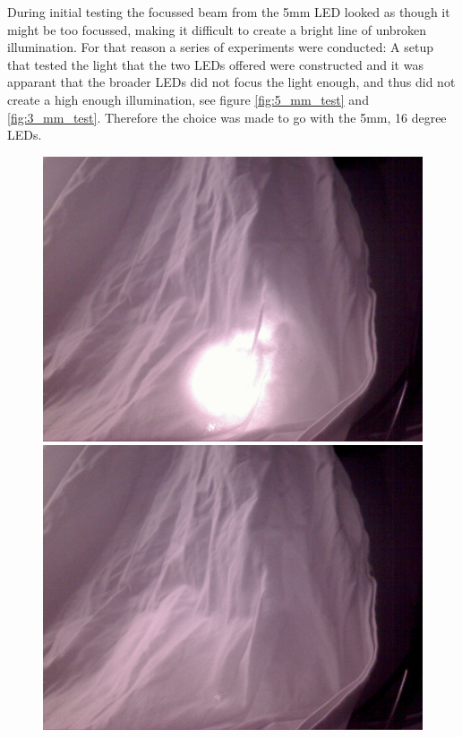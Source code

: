 During initial testing the focussed beam from the 5mm LED looked as though it might be too focussed, making it  difficult to create a bright line of unbroken illumination. For that reason a series of experiments were conducted: A setup that tested the light that the two LEDs offered were constructed and it was apparant that the broader LEDs did not focus the light enough, and thus did not create a high enough illumination, see figure \ref{fig:5_mm_test} and \ref{fig:3_mm_test}. Therefore the choice was made to go with the 5mm, 16 degree LEDs.

\begin{figure}[htbp] \centering
\begin{minipage}[b]{0.45\textwidth} \centering
\includegraphics[width=1.00\textwidth]{Pictures/Theory/5mm.jpg} %
\end{minipage} \hfill
\begin{minipage}[b]{0.45\textwidth} \centering
\includegraphics[width=1.00\textwidth]{Pictures/Theory/3mm.jpg} %

\end{minipage}
\end{figure}
